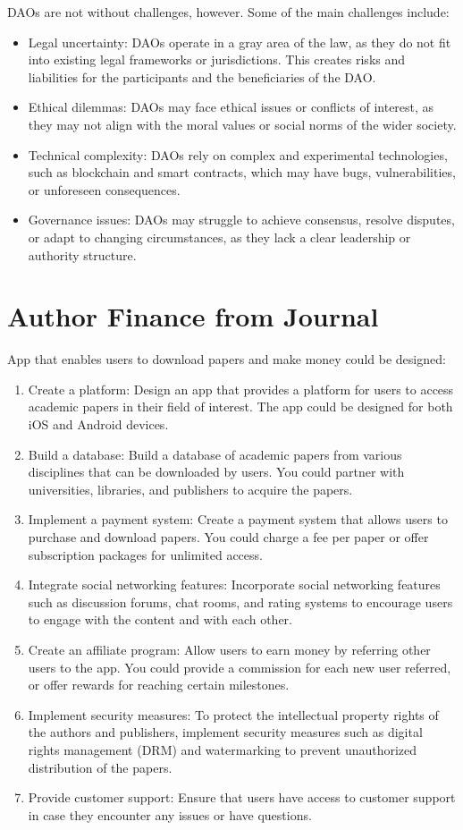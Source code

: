 \documentclass[lettersize,journal]{IEEEtran}
\begin{document}
DAOs are not without challenges, however. Some of the main challenges include:

\begin{itemize}
\item{Legal uncertainty: DAOs operate in a gray area of the law, as they do not fit into existing legal frameworks or jurisdictions. This creates risks and liabilities for the participants and the beneficiaries of the DAO.}
\item{Ethical dilemmas: DAOs may face ethical issues or conflicts of interest, as they may not align with the moral values or social norms of the wider society.}
\item{Technical complexity: DAOs rely on complex and experimental technologies, such as blockchain and smart contracts, which may have bugs, vulnerabilities, or unforeseen consequences.}
\item{Governance issues: DAOs may struggle to achieve consensus, resolve disputes, or adapt to changing circumstances, as they lack a clear leadership or authority structure.}
\end{itemize}


\section{Author Finance from Journal}


App that enables users to download papers and make money could be designed:

\begin{enumerate}
  \item {Create a platform: Design an app that provides a platform for users to access academic papers in their field of interest. The app could be designed for both iOS and Android devices.}
  \item {Build a database: Build a database of academic papers from various disciplines that can be downloaded by users. You could partner with universities, libraries, and publishers to acquire the papers.}
  \item {Implement a payment system: Create a payment system that allows users to purchase and download papers. You could charge a fee per paper or offer subscription packages for unlimited access.}
  \item {Integrate social networking features: Incorporate social networking features such as discussion forums, chat rooms, and rating systems to encourage users to engage with the content and with each other.}
  \item {Create an affiliate program: Allow users to earn money by referring other users to the app. You could provide a commission for each new user referred, or offer rewards for reaching certain milestones.}
  \item {Implement security measures: To protect the intellectual property rights of the authors and publishers, implement security measures such as digital rights management (DRM) and watermarking to prevent unauthorized distribution of the papers.}
  \item {Provide customer support: Ensure that users have access to customer support in case they encounter any issues or have questions. }
\end{enumerate}
\end{document}
